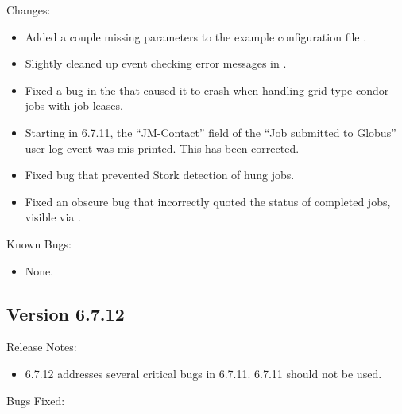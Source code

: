\noindent Changes:

\begin{itemize}

\item Added a couple missing parameters to the example configuration file
.

\item Slightly cleaned up event checking error messages in .

\item Fixed a bug in the  that caused it to crash when
handling grid-type condor jobs with job leases.

\item Starting in 6.7.11, the ``JM-Contact'' field of the ``Job submitted
to Globus'' user log event was mis-printed. This has been corrected.

\item Fixed bug that prevented Stork detection of hung jobs.

\item Fixed an obscure bug that incorrectly quoted the status of completed
jobs, visible via .

\end{itemize}

\noindent Known Bugs:

\begin{itemize}

\item None.

\end{itemize}


\subsection*{\label{sec:New-6-7.12}Version 6.7.12}

\noindent Release Notes:

\begin{itemize}

\item 6.7.12 addresses several critical bugs in 6.7.11.  6.7.11 should 
not be used.

\end{itemize}

\noindent Bugs Fixed:

